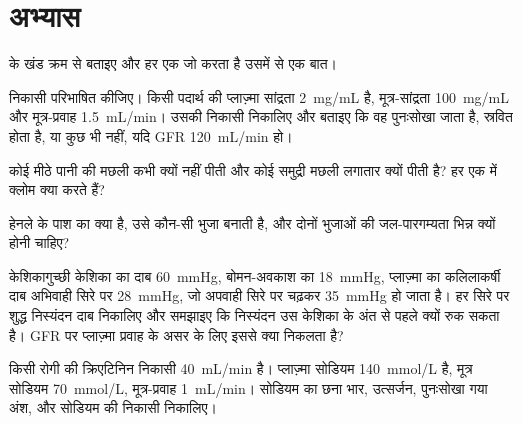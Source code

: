 \section{अभ्यास}

\begin{exercise}[$\star$]\label{exo:b3:renal-osmoregulation:1}
 के खंड क्रम से बताइए और हर एक जो करता है उसमें से एक बात।
\end{exercise}

\begin{exercise}[$\star$]\label{exo:b3:renal-osmoregulation:2}
निकासी परिभाषित कीजिए। किसी पदार्थ की प्लाज़्मा सांद्रता
\qty{2}{mg/mL} है, मूत्र-सांद्रता \qty{100}{mg/mL} और मूत्र-प्रवाह
\qty{1.5}{mL/min}। उसकी निकासी निकालिए और बताइए कि वह पुनःसोखा जाता है,
स्रवित होता है, या कुछ भी नहीं, यदि GFR \qty{120}{mL/min} हो।
\end{exercise}

\begin{exercise}[$\star$]\label{exo:b3:renal-osmoregulation:3}
कोई मीठे पानी की मछली कभी क्यों नहीं पीती और कोई समुद्री मछली लगातार
क्यों पीती है? हर एक में क्लोम क्या करते हैं?
\end{exercise}

\begin{exercise}[$\star$]\label{exo:b3:renal-osmoregulation:4}
हेनले के पाश का  क्या है, उसे कौन-सी भुजा बनाती है, और दोनों
भुजाओं की जल-पारगम्यता भिन्न क्यों होनी चाहिए?
\end{exercise}

\begin{exercise}[$\star\star$]\label{exo:b3:renal-osmoregulation:5}
केशिकागुच्छी केशिका का दाब \qty{60}{mmHg}, बोमन-अवकाश का
\qty{18}{mmHg}, प्लाज़्मा का कलिलाकर्षी दाब अभिवाही सिरे पर
\qty{28}{mmHg}, जो अपवाही सिरे पर चढ़कर \qty{35}{mmHg} हो जाता है। हर
सिरे पर शुद्ध निस्यंदन दाब निकालिए और समझाइए कि निस्यंदन उस केशिका के
अंत से पहले क्यों रुक सकता है। GFR पर प्लाज़्मा प्रवाह के असर के लिए
इससे क्या निकलता है?
\end{exercise}

\begin{exercise}[$\star\star$]\label{exo:b3:renal-osmoregulation:6}
किसी रोगी की क्रिएटिनिन निकासी \qty{40}{mL/min} है। प्लाज़्मा सोडियम
\qty{140}{mmol/L} है, मूत्र सोडियम \qty{70}{mmol/L}, मूत्र-प्रवाह
\qty{1}{mL/min}। सोडियम का छना भार, उत्सर्जन, पुनःसोखा गया अंश, और
सोडियम की निकासी निकालिए।
\end{exercise}

